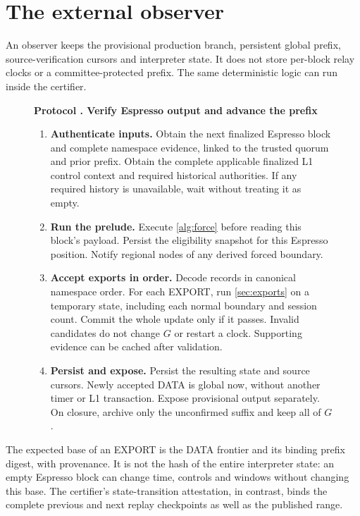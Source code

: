 \documentclass[11pt,a4paper]{article}
\newcounter{protocol}
\newenvironment{protocol}[3][htbp]{\begin{figure}[#1]\refstepcounter{protocol}\label{#2}
\begin{mdframed}[linewidth=.6pt,skipabove=0pt,skipbelow=0pt,
innertopmargin=7pt,innerbottommargin=7pt]\small
\textbf{Protocol \theprotocol. #3}\par\smallskip}{\end{mdframed}\end{figure}}
\begin{document}
\section{The external observer}
\label{sec:observers}
An observer keeps the provisional production branch, persistent global
prefix, source-verification cursors and interpreter state. It does not
store per-block relay clocks or a committee-protected prefix.
The same deterministic logic can run inside the certifier.

\begin{protocol}{alg:external}{Verify Espresso output and advance the prefix}
\begin{enumerate}[label=\textbf{\arabic*)},itemsep=3pt]
\item \textbf{Authenticate inputs.} Obtain the next finalized
Espresso block and complete namespace evidence, linked to the trusted
quorum and prior prefix. Obtain the complete applicable finalized L1
control context and required historical authorities. If any required
history is unavailable, wait without treating it as empty.

\item \textbf{Run the prelude.} Execute \cref{alg:force} before
reading this block's payload. Persist the eligibility snapshot for this
Espresso position. Notify regional nodes of any derived forced boundary.

\item \textbf{Accept exports in order.} Decode records in canonical
namespace order. For each EXPORT, run \cref{sec:exports} on a temporary
state, including each normal boundary and session count. Commit the
whole update only if it passes. Invalid candidates do not change $G$
or restart a clock. Supporting evidence can be cached after validation.

\item \textbf{Persist and expose.} Persist the resulting state and
source cursors. Newly accepted DATA is global now, without another
timer or L1 transaction. Expose provisional output separately.
On closure, archive only the unconfirmed suffix and keep all of $G$.
\end{enumerate}
\end{protocol}

The expected base of an EXPORT is the DATA frontier and its binding
prefix digest, with provenance. It is not the hash of the entire
interpreter state: an empty Espresso block can change time, controls
and windows without changing this base. The certifier's state-transition
attestation, in contrast, binds the complete previous and next replay
checkpoints as well as the published range.
\end{document}
